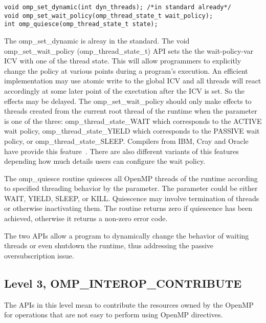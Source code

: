 \begin{lstlisting}[frame=single]
void omp_set_dynamic(int dyn_threads); /*in standard already*/
void omp_set_wait_policy(omp_thread_state_t wait_policy);
int omp_quiesce(omp_thread_state_t state);
\end{lstlisting}
The {\sf omp\_set\_dynamic} is alreay in the standard. The {\sf void omp\_set\_wait\_policy (omp\_thread\_state\_t)} API
sets the the wait-policy-var
ICV with one of the thread state. This will allow programmers to explicitly change the policy at various 
points during a program's execution. An efficient implementation may use atomic write to the 
global ICV and all threads will react accordingly at some later point of the exectution after the 
ICV is set. So the effects may be delayed. 
The {\sf omp\_set\_wait\_policy} should only make effects to threads created from the current root thread 
of the runtime when the parameter is one of the three:
{\sf omp\_thread\_state\_WAIT} which corresponds to the {\sf ACTIVE} wait policy, 
{\sf omp\_thread\_state\_YIELD} which corresponds to the {\sf PASSIVE} wait policy, or
{\sf omp\_thread\_state\_SLEEP}. 
Compilers from IBM, Cray and Oracle have provide this feature~\cite{ibmwait,craywait,oraclewait}.
There are also different variants of this features depending how much details users can configure
the wait policy.

The {\sf omp\_quiesce} routine quiesces all OpenMP threads of the runtime according to specified threading behavior by the parameter. The
parameter could be either WAIT, YIELD, SLEEP, or KILL. Quiescence may involve termination
 of threads or otherwise inactivating them. The routine returns zero if quiescence has been achieved, otherwise it returns a non-zero error code.

The two APIs allow a program to dynamically change the behavior of waiting threads or even shutdown the runtime, thus addressing the passive
oversubscription issue. 
\subsection{Level 3, OMP\_INTEROP\_CONTRIBUTE}
The APIs in this level mean to contribute the resources owned by the OpenMP for operations that are not easy to perform using OpenMP directives.  

